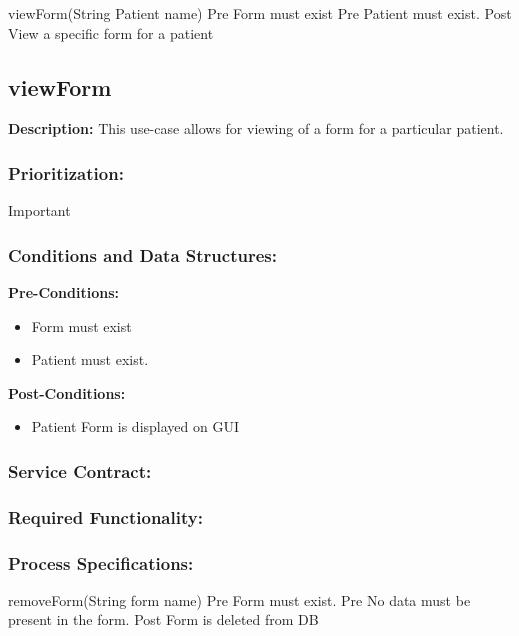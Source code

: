 

viewForm(String Patient name)	
Pre Form must exist
Pre Patient must exist.	
Post View a specific form for a patient
\subsection{viewForm}
\textbf{Description:}
This use-case allows for viewing of a form for a particular patient.
\subsubsection{Prioritization:}
Important
\subsubsection{Conditions and Data Structures:}
\textbf{Pre-Conditions:}
\begin{itemize}
	\item Form must exist
	\item Patient must exist.
\end{itemize}

\textbf{Post-Conditions:}	
\begin{itemize}
	\item Patient Form is displayed on GUI
\end{itemize}
\subsubsection{Service Contract:} 
\subsubsection{Required Functionality:} 
\subsubsection{Process Specifications:} 





removeForm(String form name)	
Pre Form must exist. 
Pre No data must be present in the form.	
Post Form is deleted from DB

